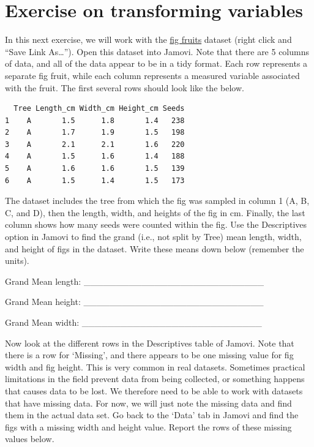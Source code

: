\documentclass[
]{scrbook}
\begin{document}
\hypertarget{transforming_variables_02}{%
\section{Exercise on transforming variables}\label{transforming_variables_02}}

In this next exercise, we will work with the \href{https://raw.githubusercontent.com/bradduthie/SCIU4T4/main/data/fig_fruits.csv}{fig fruits} dataset (right click and ``Save Link As\ldots{}'').
Open this dataset into Jamovi.
Note that there are 5 columns of data, and all of the data appear to be in a tidy format.
Each row represents a separate fig fruit, while each column represents a measured variable associated with the fruit.
The first several rows should look like the below.

\begin{verbatim}
  Tree Length_cm Width_cm Height_cm Seeds
1    A       1.5      1.8       1.4   238
2    A       1.7      1.9       1.5   198
3    A       2.1      2.1       1.6   220
4    A       1.5      1.6       1.4   188
5    A       1.6      1.6       1.5   139
6    A       1.5      1.4       1.5   173
\end{verbatim}

The dataset includes the tree from which the fig was sampled in column 1 (A, B, C, and D), then the length, width, and heights of the fig in cm.
Finally, the last column shows how many seeds were counted within the fig.
Use the Descriptives option in Jamovi to find the grand (i.e., not split by Tree) mean length, width, and height of figs in the dataset.
Write these means down below (remember the units).

Grand Mean length: \_\_\_\_\_\_\_\_\_\_\_\_\_\_\_\_\_\_\_\_\_\_\_\_\_\_\_\_

Grand Mean height: \_\_\_\_\_\_\_\_\_\_\_\_\_\_\_\_\_\_\_\_\_\_\_\_\_\_\_\_

Grand Mean width: \_\_\_\_\_\_\_\_\_\_\_\_\_\_\_\_\_\_\_\_\_\_\_\_\_\_\_\_

Now look at the different rows in the Descriptives table of Jamovi.
Note that there is a row for `Missing', and there appears to be one missing value for fig width and fig height.
This is very common in real datasets.
Sometimes practical limitations in the field prevent data from being collected, or something happens that causes data to be lost.
We therefore need to be able to work with datasets that have missing data.
For now, we will just note the missing data and find them in the actual data set.
Go back to the `Data' tab in Jamovi and find the figs with a missing width and height value.
Report the rows of these missing values below.
\end{document}
